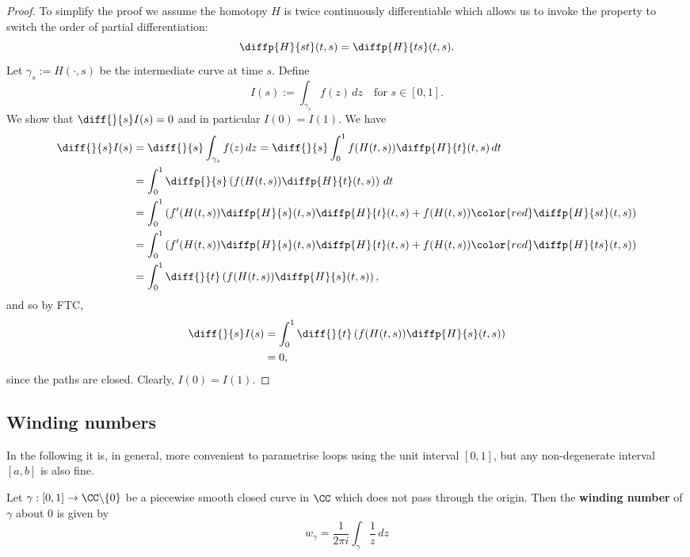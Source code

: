 \documentclass[12pt, a4paper]{article}
\begin{document}
\begin{proof}
    To simplify the proof we assume the homotopy \(H\) is twice continuously differentiable which allows us to invoke the property to switch the order of partial differentiation:
    \[\diffp{H}{{s}{t}}(t,s) =\diffp{H}{{t}{s}}(t,s).\]
    Let \(\gamma_s :=H(\cdot,s)\) be the intermediate curve at time \(s\). Define 
    \[I(s) := \int_{\gamma_s} f(z) \, dz \quad \text{for }s \in [0,1].\]
    We show that \(\diff{}{s}I(s) =0\) and in particular \(I(0)=I(1)\). We have
    \[\begin{aligned}
        \diff{}{s}I(s) &= \diff{}{s} \int_{\gamma_s} f(z) \, dz = \diff{}{s} \int_{0}^1 f(H(t,s)) \diffp{H}{t}(t,s) \, dt \\
        &= \int_{0}^1 \diffp{}{s} \left( f(H(t,s)) \diffp{H}{t}(t,s) \right) \, dt \\
        &= \int_{0}^{1} \left( f'(H(t,s))\diffp{H}{s}(t,s)\diffp{H}{t}(t,s)+f(H(t,s)) {\color{red}\diffp{H}{{s}{t}}(t,s)}  \right) \\
        &= \int_{0}^{1} \left( f'(H(t,s))\diffp{H}{s}(t,s)\diffp{H}{t}(t,s)+f(H(t,s)) {\color{red}\diffp{H}{{t}{s}}(t,s)}  \right) \\
        &= \int_0^1 \diff{}{t} \left( f(H(t,s)) \diffp{H}{s}(t,s) \right),
    \end{aligned}\]
    and so by FTC,
    \[\begin{aligned}
        \diff{}{s}I(s) &= \int_0^1 \diff{}{t} \left( f(H(t,s)) \diffp{H}{s}(t,s) \right) \\
        &= 0,
    \end{aligned}\]
    since the paths are closed. Clearly, \(I(0)=I(1)\).
\end{proof}

\subsection{Winding numbers}

\begin{mdremark}
    In the following it is, in general, more convenient to parametrise loops using the unit interval \([0,1]\), but any non-degenerate interval \([a,b]\) is also fine.
\end{mdremark}

\begin{definition}
    Let \(\gamma:[0,1] \to \CC \backslash \{0\}\) be a piecewise smooth closed curve in \(\CC\) which does not pass through the origin. Then the \textbf{winding number} of \(\gamma\) about \(0\) is given by 
    \[w_{\gamma} = \frac{1}{2\pi i} \int_{\gamma} \frac{1}{z} \, dz\]
\end{definition}
\end{document}
